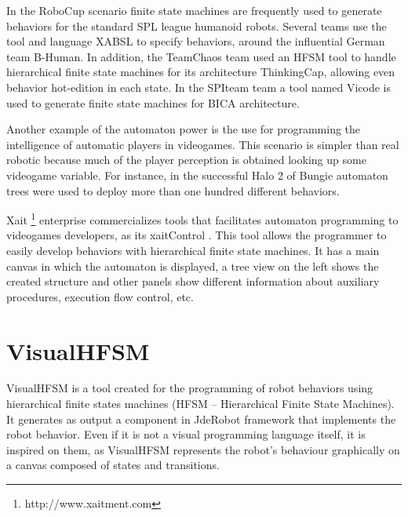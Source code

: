 \documentclass[journal,twoside]{JoPhA}
\begin{document}
In the RoboCup scenario finite state machines are frequently used to generate behaviors for the standard SPL league humanoid robots. Several teams use the tool and language XABSL \cite{lotzsch2004,risler2009} to specify behaviors, around the influential German team B-Human. In addition, the TeamChaos team \cite{herrero2006} used an HFSM tool to handle hierarchical finite state machines for its architecture ThinkingCap, allowing even behavior hot-edition in each state. In the SPIteam team a tool named Vicode is used to generate finite state machines for BICA architecture.

Another  example  of  the  automaton  power  is  the  use for programming the intelligence of automatic players in videogames. This scenario is simpler than real robotic because much of the player perception is obtained looking up some videogame variable. For instance, in the successful Halo 2 of Bungie automaton trees were used to deploy more than one hundred different behaviors.

Xait \footnote{http://www.xaitment.com} enterprise  commercializes  tools  that  facilitates automaton programming to videogames developers, as its xaitControl %
. This tool allows the programmer to  easily  develop  behaviors  with  hierarchical  finite  state machines. It has a main canvas in which the automaton is displayed, a tree view on the left shows the created structure and other panels show different information about auxiliary procedures, execution flow control, etc.




\section{VisualHFSM}
VisualHFSM is a tool created for the programming of robot behaviors using hierarchical finite states machines (HFSM – Hierarchical Finite State Machines). It generates as output a component in JdeRobot framework that implements the robot behavior. Even if it is not a visual programming language itself, it is inspired on them, as VisualHFSM represents the robot’s behaviour graphically on a canvas composed of states and transitions. 
\end{document}
